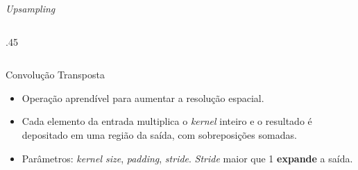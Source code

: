 \documentclass[aspectratio=169,xcolor=dvipsnames]{beamer}
\begin{document}
\begin{frame}{\textit{Upsampling}}
\begin{columns}[T]
\begin{column}{.45\linewidth}
    \end{column}
\end{columns}
\end{frame}

\begin{frame}{Convolução Transposta}
\begin{itemize}
    \item Operação aprendível para aumentar a resolução espacial.
    \item Cada elemento da entrada multiplica o \textit{kernel} inteiro e o resultado é depositado em uma região da saída, com sobreposições somadas.
    \item Parâmetros: \textit{kernel size}, \textit{padding}, \textit{stride}. \textit{Stride} maior que 1 \textbf{expande} a saída.
\end{itemize}
\end{frame}
\end{document}
